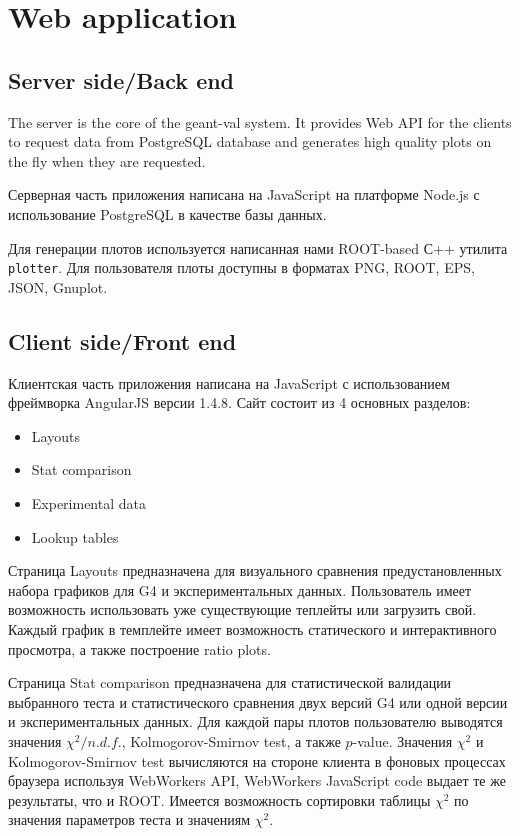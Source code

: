 \section{Web application}
\label{sec-webapplication}

\subsection{Server side/Back end}
\label{sec-webapplication-server}

The server is the core of the geant-val system. It provides Web API for the clients to request data from PostgreSQL database
and generates high quality plots on the fly when they are requested.

Серверная часть приложения написана на JavaScript на платформе Node.js с использование PostgreSQL в качестве базы данных.

Для генерации плотов используется написанная нами ROOT-based С++ утилита {\tt plotter}. Для пользователя плоты доступны в форматах PNG, ROOT, EPS, JSON, Gnuplot.

\subsection{Client side/Front end}
\label{sec-webapplication-client}

Клиентская часть приложения написана на JavaScript с использованием фреймворка AngularJS версии 1.4.8. Сайт состоит из 4 основных разделов:
\begin{itemize}
    \item Layouts
    \item Stat comparison
    \item Experimental data
    \item Lookup tables
\end{itemize}

Страница Layouts предназначена для визуального сравнения предустановленных набора графиков для G4 и экспериментальных данных. Пользователь имеет возможность использовать уже существующие теплейты или загрузить свой. Каждый график в темплейте имеет возможность статического и интерактивного просмотра, а также построение ratio plots.

Страница Stat comparison предназначена для статистической валидации выбранного теста и статистического сравнения двух версий G4 или одной версии и экспериментальных данных. Для каждой пары плотов пользователю выводятся значения $\chi^2/n.d.f.$, Kolmogorov-Smirnov test, а также $p$-value. Значения $\chi^2$ и Kolmogorov-Smirnov test вычисляются на стороне клиента в фоновых процессах браузера используя WebWorkers API, WebWorkers JavaScript code выдает те же результаты, что и ROOT. Имеется возможность сортировки таблицы $\chi^2$ по значения параметров теста и значениям $\chi^2$.

